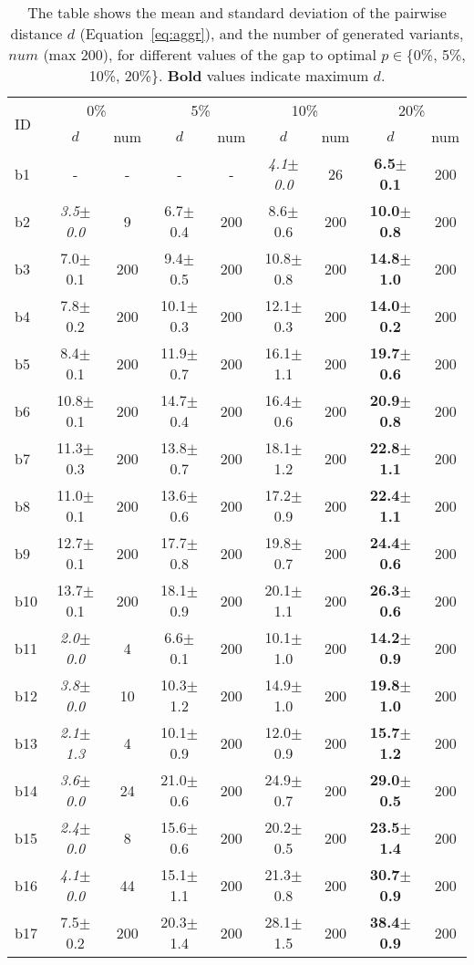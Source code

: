 \begin{longtable}{|l|c|c|c|c|c|c|c|c|}
\caption{\label{tab:agaps} The table shows the mean and standard deviation of the pairwise distance 
			$d$ (Equation~\ref{eq:aggr}), and the number of generated variants, $num$ (max  200),
			for different values of the gap to optimal $p\in$\{0\%, 5\%, 10\%, 20\%\}. \textbf{Bold} values indicate maximum $d$.}\\
\hline
\multirow{2}{*}{ID}&\multicolumn{2}{c|}{0\%}&\multicolumn{2}{c|}{5\%}&\multicolumn{2}{c|}{10\%}&\multicolumn{2}{c|}{20\%}\\
\cline{2-9}
&$d$&num&$d$&num&$d$&num&$d$&num\\
\hline
b1&- & -&- & -&\textit{4.1$\pm$0.0} & 26&\textbf{6.5$\pm$0.1} & 200
\\
b2&\textit{3.5$\pm$0.0} & 9&6.7$\pm$0.4 & 200&8.6$\pm$0.6 & 200&\textbf{10.0$\pm$0.8} & 200
\\
b3&7.0$\pm$0.1 & 200&9.4$\pm$0.5 & 200&10.8$\pm$0.8 & 200&\textbf{14.8$\pm$1.0} & 200
\\
b4&7.8$\pm$0.2 & 200&10.1$\pm$0.3 & 200&12.1$\pm$0.3 & 200&\textbf{14.0$\pm$0.2} & 200
\\
b5&8.4$\pm$0.1 & 200&11.9$\pm$0.7 & 200&16.1$\pm$1.1 & 200&\textbf{19.7$\pm$0.6} & 200
\\
b6&10.8$\pm$0.1 & 200&14.7$\pm$0.4 & 200&16.4$\pm$0.6 & 200&\textbf{20.9$\pm$0.8} & 200
\\
b7&11.3$\pm$0.3 & 200&13.8$\pm$0.7 & 200&18.1$\pm$1.2 & 200&\textbf{22.8$\pm$1.1} & 200
\\
b8&11.0$\pm$0.1 & 200&13.6$\pm$0.6 & 200&17.2$\pm$0.9 & 200&\textbf{22.4$\pm$1.1} & 200
\\
b9&12.7$\pm$0.1 & 200&17.7$\pm$0.8 & 200&19.8$\pm$0.7 & 200&\textbf{24.4$\pm$0.6} & 200
\\
b10&13.7$\pm$0.1 & 200&18.1$\pm$0.9 & 200&20.1$\pm$1.1 & 200&\textbf{26.3$\pm$0.6} & 200
\\
b11&\textit{2.0$\pm$0.0} & 4&6.6$\pm$0.1 & 200&10.1$\pm$1.0 & 200&\textbf{14.2$\pm$0.9} & 200
\\
b12&\textit{3.8$\pm$0.0} & 10&10.3$\pm$1.2 & 200&14.9$\pm$1.0 & 200&\textbf{19.8$\pm$1.0} & 200
\\
b13&\textit{2.1$\pm$1.3} & 4&10.1$\pm$0.9 & 200&12.0$\pm$0.9 & 200&\textbf{15.7$\pm$1.2} & 200
\\
b14&\textit{3.6$\pm$0.0} & 24&21.0$\pm$0.6 & 200&24.9$\pm$0.7 & 200&\textbf{29.0$\pm$0.5} & 200
\\
b15&\textit{2.4$\pm$0.0} & 8&15.6$\pm$0.6 & 200&20.2$\pm$0.5 & 200&\textbf{23.5$\pm$1.4} & 200
\\
b16&\textit{4.1$\pm$0.0} & 44&15.1$\pm$1.1 & 200&21.3$\pm$0.8 & 200&\textbf{30.7$\pm$0.9} & 200
\\
b17&7.5$\pm$0.2 & 200&20.3$\pm$1.4 & 200&28.1$\pm$1.5 & 200&\textbf{38.4$\pm$0.9} & 200
\\
\hline
\end{longtable}
